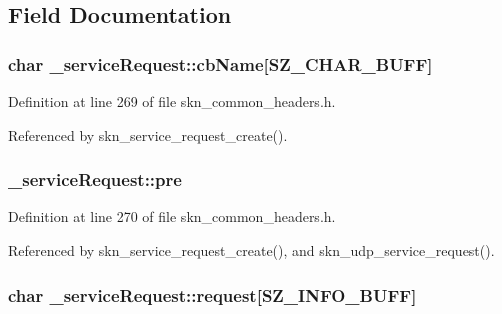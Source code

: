 \subsection{Field Documentation}
\subsubsection[{\texorpdfstring{cb\+Name}{cbName}}]{\setlength{\rightskip}{0pt plus 5cm}char \+\_\+service\+Request\+::cb\+Name\mbox{[}{\bf S\+Z\+\_\+\+C\+H\+A\+R\+\_\+\+B\+U\+FF}\mbox{]}}\hypertarget{struct__service_request_aab7831722782ba05f0c94087598a941e}{}\label{struct__service_request_aab7831722782ba05f0c94087598a941e}


Definition at line 269 of file skn\+\_\+common\+\_\+headers.\+h.



Referenced by skn\+\_\+service\+\_\+request\+\_\+create().

\subsubsection[{\texorpdfstring{pre}{pre}}]{ \+\_\+service\+Request\+::pre}\hypertarget{struct__service_request_acf8d45e7f9cb65b555217aae74cd72c5}{}\label{struct__service_request_acf8d45e7f9cb65b555217aae74cd72c5}


Definition at line 270 of file skn\+\_\+common\+\_\+headers.\+h.



Referenced by skn\+\_\+service\+\_\+request\+\_\+create(), and skn\+\_\+udp\+\_\+service\+\_\+request().

\subsubsection[{\texorpdfstring{request}{request}}]{\setlength{\rightskip}{0pt plus 5cm}char \+\_\+service\+Request\+::request\mbox{[}{\bf S\+Z\+\_\+\+I\+N\+F\+O\+\_\+\+B\+U\+FF}\mbox{]}}\hypertarget{struct__service_request_ad347b2a07388ec9d9d33756f1a1ef235}{}\label{struct__service_request_ad347b2a07388ec9d9d33756f1a1ef235}


